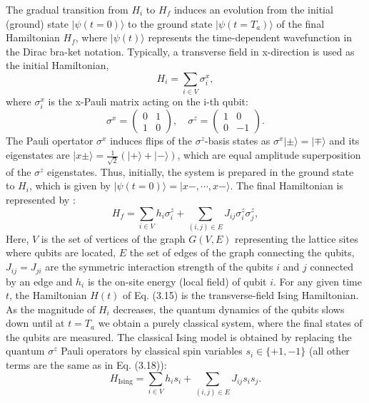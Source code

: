 The gradual transition from $H_i$ to $H_f$ induces an evolution from the initial (ground) state $|\psi(t = 0)\rangle$ to the ground state $|\psi(t = T_a)\rangle$ of the final Hamiltonian $H_f$, where $|\psi(t)\rangle$ represents the time-dependent wavefunction in the Dirac bra-ket notation. Typically, a transverse field in x-direction is used as the initial Hamiltonian,
\begin{equation}
H_i = \sum_{i \in V} \sigma^x_i,
\end{equation}
where $\sigma^x_i$ is the x-Pauli matrix acting on the i-th qubit:
\begin{equation}
\sigma^x = \begin{pmatrix} 0 & 1 \\ 1 & 0 \end{pmatrix}, \quad
\sigma^z = \begin{pmatrix} 1 & 0 \\ 0 & -1 \end{pmatrix}.
\end{equation}
The Pauli opertator $\sigma^x$ induces flips of the $\sigma^z$-basis states as $\sigma^x|\pm\rangle = |\mp\rangle$ and its eigenstates are $|x\pm\rangle = \frac{1}{\sqrt{2}}(|+\rangle + |-\rangle)$, which are equal amplitude superposition of the $\sigma^z$ eigenstates. Thus, initially, the system is prepared in the ground state to $H_i$, which is given by $|\psi(t = 0)\rangle = |x-,\cdots,x-\rangle$. The final Hamiltonian is represented by  \cite{QAKadowaki1998QuantumAI}:
\begin{equation}
H_f = \sum_{i \in V} h_i \sigma^z_i + \sum_{(i,j) \in E} J_{ij} \sigma^z_i \sigma^z_j,
\end{equation}
Here, $V$ is the set of vertices of the graph $G(V,E)$ representing the lattice sites where qubits are located, $E$ the set of edges of the graph connecting the qubits, $J_{ij} = J_{ji}$ are the symmetric interaction strength of the qubits $i$ and $j$ connected by an edge and $h_i$ is the on-site energy (local field) of qubit $i$. For any given time $t$, the Hamiltonian $H(t)$ of Eq. (3.15) is the transverse-field Ising Hamiltonian. As the magnitude of $H_i$ decreases, the quantum dynamics of the qubits slows down until at $t = T_a$ we obtain a purely classical system, where the final states of the qubits are measured. The classical Ising model is obtained by replacing the quantum $\sigma^z$ Pauli operators by classical spin variables  \(s_i \in \{+1, -1\}\) (all other terms are the same as in Eq. (3.18)):
\begin{equation}
H_{\text{Ising}} = \sum_{i \in V} h_i s_i + \sum_{(i,j) \in E} J_{ij} s_i s_j.
\end{equation}

